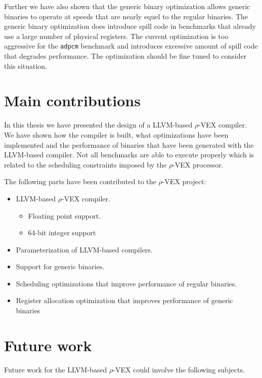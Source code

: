 Further we have also shown that the generic binary optimization allows generic binaries to operate at speeds that are nearly equel to the regular binaries. The generic binary optimization does introduce spill code in benchmarks that already use a large number of physical registers. The current optimization is too aggressive for the \texttt{adpcm} benchmark and introduces excessive amount of spill code that degrades performance. The optimization should be fine tuned to consider this situation.

\section{Main contributions}
In this thesis we have presented the design of a LLVM-based $\rho$-VEX compiler. We have shown how the compiler is built, what optimizations have been implemented and the performance of binaries that have been generated with the LLVM-based compiler. Not all benchmarks are able to execute properly which is related to the scheduling constraints imposed by the $\rho$-VEX processor.

The following parts have been contributed to the $\rho$-VEX project:

\begin{itemize}
	\item LLVM-based $\rho$-VEX compiler.
	\begin{itemize}
		\item Floating point support.
		\item 64-bit integer support
	\end{itemize}
	\item Parameterization of LLVM-based compilers.
	\item Support for generic binaries.
	\item Scheduling optimizations that improve performance of regular binaries.
	\item Register allocation optimization that improves performance of generic binaries
\end{itemize}

\section{Future work}
Future work for the LLVM-based $\rho$-VEX could involve the following subjects.

